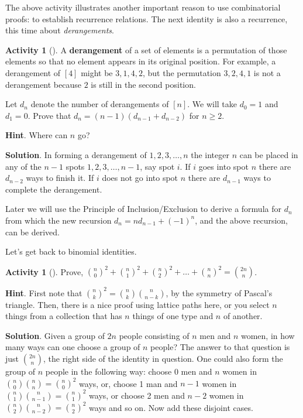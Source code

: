 \documentclass[10pt,]{book}
\newcommand{\terminology}[1]{\textbf{#1}}
\theoremstyle{plain}
\theoremstyle{definition}
\theoremstyle{definition}
\theoremstyle{definition}
\newtheorem{activity}[project]{Activity}
\numberwithin{equation}{chapter}
\begin{document}
\hypertarget{p-703}{}%
The above activity illustrates another important reason to use combinatorial proofs: to establish recurrence relations.  The next identity is also a recurrence, this time about \emph{derangements}.%
\begin{activity}[]\label{activity-93}
\hypertarget{p-704}{}%
A \terminology{derangement} of a set of elements is a permutation of those elements so that no element appears in its original position.  For example, a derangement of \([4]\) might be \(3,1,4,2\), but the permutation \(3,2,4,1\) is not a derangement because \(2\) is still in the second position.%
\par
\hypertarget{p-705}{}%
Let \(d_{n}\) denote the number of derangements of \([n]\).  We will take \(d_{0} = 1\) and \(d_{1} = 0\).  Prove that \(d_{n} = (n - 1)(d_{n - 1}+ d_{n - 2})\) for \(n \geq 2\).%
\par\smallskip%
\noindent\textbf{Hint}.\hypertarget{hint-54}{}\quad%
\hypertarget{p-706}{}%
Where can \(n\) go?%
\par\smallskip%
\noindent\textbf{Solution}.\hypertarget{solution-48}{}\quad%
\hypertarget{p-707}{}%
In forming a derangement of \(1, 2, 3, \ldots, n\) the integer \(n\) can be placed in any of the \(n - 1\) spots \(1, 2, 3, \ldots, n - 1\), say spot \(i\). If \(i\) goes into spot \(n\) there are \(d_{n - 2}\) ways to finish it. If \(i\) does not go into spot \(n\) there are \(d_{n - 1}\) ways to complete the derangement.%
\end{activity}
\hypertarget{p-708}{}%
Later we will use the Principle of Inclusion/Exclusion to derive a formula for \(d_{n}\) from which the new recursion \(d_{n} = nd_{n - 1} + \left( - 1 \right)^{n}\), and the above recursion, can be derived.%
\par
\hypertarget{p-709}{}%
Let's get back to binomial identities.%
\begin{activity}[]\label{activity-94}
\hypertarget{p-710}{}%
Prove, \(\binom{n}{0}^{2} + \binom{n}{1}^{2} + \binom{n}{2}^{2} + \ldots + \binom{n}{n}^{2} = \binom{2n}{n}\).%
\par\smallskip%
\noindent\textbf{Hint}.\hypertarget{hint-55}{}\quad%
\hypertarget{p-711}{}%
First note that \(\binom{n}{k}^2 = \binom{n}{k}\binom{n}{n-k}\), by the symmetry of Pascal's triangle.  Then, there is a nice proof using lattice paths here, or you select \(n\) things from a collection that has \(n\) things of one type and \(n\) of another.%
\par\smallskip%
\noindent\textbf{Solution}.\hypertarget{solution-49}{}\quad%
\hypertarget{p-712}{}%
Given a group of \(2n\) people consisting of \(n\) men and \(n\) women, in how many ways can one choose a group of \(n\) people? The answer to that question is just \(\binom{2n}{n}\), the right side of the identity in question. One could also form the group of \(n\) people in the following way: choose 0 men and \(n\) women in \(\binom{n}{0} \binom{n}{n} = \binom{n}{0}^{2}\) ways, or, choose 1 man and \(n - 1\) women in \(\binom{n}{1} \binom{n}{n - 1} = \binom{n}{1}^{2}\) ways, or choose 2 men and \(n - 2\) women in \(\binom{n}{2} \binom{n}{n - 2} = \binom{n}{2}^{2}\) ways and so on. Now add these disjoint cases.%
\end{activity}
\end{document}
